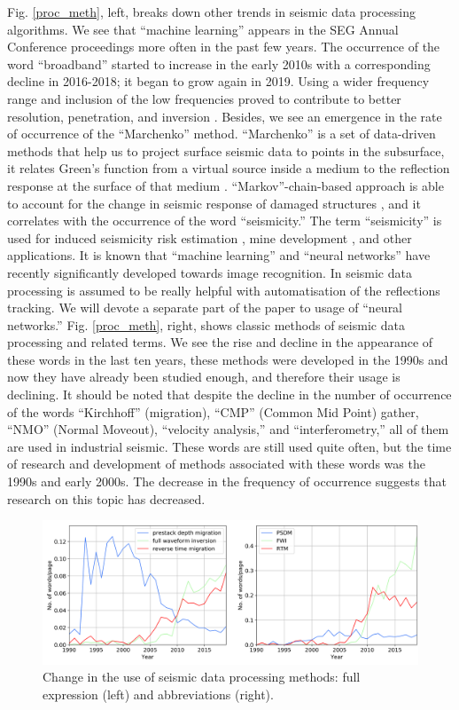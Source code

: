 \documentclass[geosciences,article,submit,moreauthors,pdftex]{Definitions/mdpi}
\begin{document}
Fig. \ref{proc_meth}, left, breaks down other trends in seismic data processing algorithms. We see that ``machine learning'' appears in the SEG Annual Conference proceedings more often in the past few years. The occurrence of the word ``broadband'' started to increase in the early 2010s with a corresponding decline in 2016-2018; it began to grow again in 2019. Using a wider frequency range and inclusion of the low frequencies proved to contribute to better resolution, penetration, and inversion \citep{Kroode2013}. Besides, we see an emergence in the rate of occurrence of the ``Marchenko'' method. ``Marchenko'' is a set of data-driven methods that help us to project surface seismic data to points in the subsurface, it relates Green’s function from a virtual source inside a medium to the reflection response at the surface of that medium \citep{Lomas2019, Thorbecke2017}. ``Markov''-chain-based approach is able to account for the change in seismic response of damaged structures \citep{Iervolino2016}, and it correlates with the occurrence of the word ``seismicity.'' The term ``seismicity'' is used for induced seismicity risk estimation \citep{Weir2018}, mine development \citep{Barthwal2018}, and other applications. It is known that ``machine learning'' and ``neural networks'' have recently significantly developed towards image recognition. In seismic data processing is assumed to be really helpful with automatisation of the reflections tracking. We will devote a separate part of the paper to usage of ``neural networks.'' Fig. \ref{proc_meth}, right, shows classic methods of seismic data processing and related terms. We see the rise and decline in the appearance of these words in the last ten years, these methods were developed in the 1990s and now they have already been studied enough, and therefore their usage is declining. It should be noted that despite the decline in the number of occurrence of the words ``Kirchhoff'' (migration), ``CMP'' (Common Mid Point) gather, ``NMO'' (Normal Moveout), ``velocity analysis,'' and ``interferometry,'' all of them are used in industrial seismic. These words are still used quite often, but the time of research and development of methods associated with these words was the 1990s and early 2000s. The decrease in the frequency of occurrence suggests that research on this topic has decreased.


\begin{figure}[ht!]

\includegraphics[width=\textwidth]{fwi_rtm_psdm_both.png} 
\caption{Change in the use of seismic data processing methods: full expression (left) and abbreviations (right).}
\label{fwi_psdm}
\end{figure}
\end{document}
